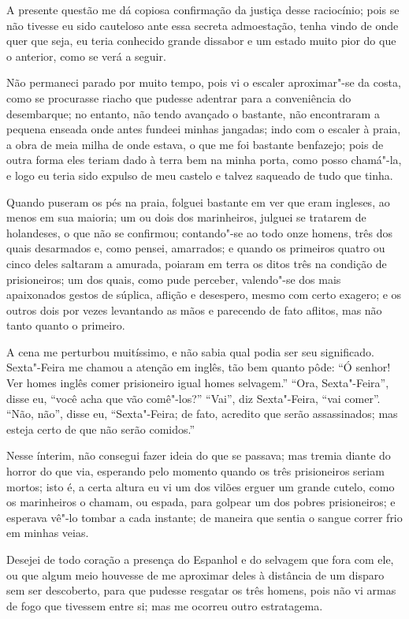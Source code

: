 A presente questão me dá copiosa confirmação da justiça desse
raciocínio; pois se não tivesse eu sido cauteloso ante essa secreta
admoestação, tenha vindo de onde quer que seja, eu teria conhecido
grande dissabor e um estado muito pior do que o anterior, como se verá a
seguir.

Não permaneci parado por muito tempo, pois vi o escaler aproximar"-se da
costa, como se procurasse riacho que pudesse adentrar para a
conveniência do desembarque; no entanto, não tendo avançado o bastante,
não encontraram a pequena enseada onde antes fundeei minhas jangadas;
indo com o escaler à praia, a obra de meia milha de onde estava, o que
me foi bastante benfazejo; pois de outra forma eles teriam dado à terra
bem na minha porta, como posso chamá"-la, e logo eu teria sido expulso de
meu castelo e talvez saqueado de tudo que tinha.

Quando puseram os pés na praia, folguei bastante em ver que eram
ingleses, ao menos em sua maioria; um ou dois dos marinheiros, julguei
se tratarem de holandeses, o que não se confirmou; contando"-se ao todo
onze homens, três dos quais desarmados e, como pensei, amarrados; e
quando os primeiros quatro ou cinco deles saltaram a amurada, poiaram em
terra os ditos três na condição de prisioneiros; um dos quais, como pude
perceber, valendo"-se dos mais apaixonados gestos de súplica, aflição e
desespero, mesmo com certo exagero; e os outros dois por vezes
levantando as mãos e parecendo de fato aflitos, mas não tanto quanto o
primeiro.

A cena me perturbou muitíssimo, e não sabia qual podia ser seu
significado. Sexta"-Feira me chamou a atenção em inglês, tão bem quanto
pôde: ``Ó senhor! Ver homes inglês comer prisioneiro igual homes
selvagem.'' ``Ora, Sexta"-Feira'', disse eu, ``você acha que vão
comê"-los?'' ``Vai'', diz Sexta"-Feira, ``vai comer''. ``Não, não'', disse
eu, ``Sexta"-Feira; de fato, acredito que serão assassinados; mas esteja
certo de que não serão comidos.''

Nesse ínterim, não consegui fazer ideia do que se passava; mas tremia
diante do horror do que via, esperando pelo momento quando os três
prisioneiros seriam mortos; isto é, a certa altura eu vi um dos vilões
erguer um grande cutelo, como os marinheiros o chamam, ou espada, para
golpear um dos pobres prisioneiros; e esperava vê"-lo tombar a cada
instante; de maneira que sentia o sangue correr frio em minhas veias.

Desejei de todo coração a presença do Espanhol e do selvagem que fora
com ele, ou que algum meio houvesse de me aproximar deles à distância de
um disparo sem ser descoberto, para que pudesse resgatar os três homens,
pois não vi armas de fogo que tivessem entre si; mas me ocorreu outro
estratagema.

